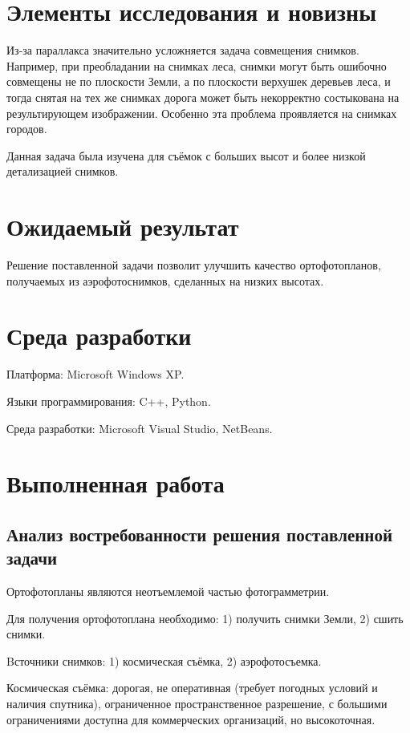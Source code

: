 \documentclass[a4paper,10pt]{article}
\begin{document}
\section{Элементы исследования и новизны}
Из-за параллакса значительно усложняется задача совмещения снимков. 
Например, при преобладании на снимках леса,
снимки могут быть ошибочно совмещены не по плоскости Земли, 
а по плоскости верхушек деревьев леса, и
тогда снятая на тех же снимках дорога может быть некорректно состыкована на результирующем изображении.
Особенно эта проблема проявляется на снимках городов.

Данная задача была изучена для съёмок с больших высот и более низкой детализацией снимков.

\section{Ожидаемый результат}
Решение поставленной задачи позволит улучшить качество ортофотопланов, 
получаемых из аэрофотоснимков, сделанных на низких высотах. 

\section{Среда разработки}

Платформа: Microsoft Windows XP.

Языки программирования: C++, Python.

Среда разработки: Microsoft Visual Studio, NetBeans.

\section{Выполненная работа}

\subsection{Анализ востребованности решения поставленной задачи}
Ортофотопланы являются неотъемлемой частью фотограмметрии.

Для получения ортофотоплана необходимо:
   1) получить снимки Земли, 
   2) сшить снимки.

Bсточники снимков: 
   1) космическая съёмка, 
   2) аэрофотосъемка.
   
Космическая съёмка: 
   дорогая, 
   не оперативная (требует погодных условий и наличия спутника), 
   ограниченное пространственное разрешение, 
   с большими ограничениями доступна для коммерческих организаций, 
   но высокоточная.
\end{document}
